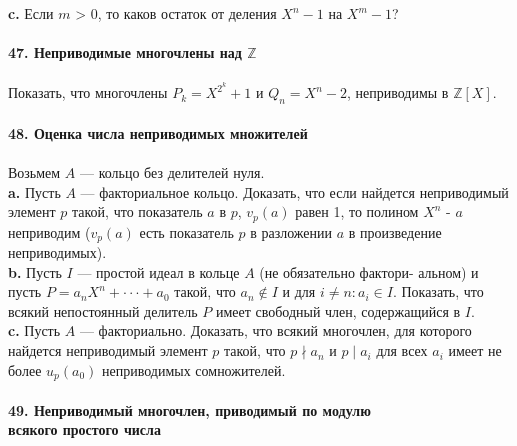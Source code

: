 \documentclass{mai_book}
\begin{document}
\noindent\hspace*{10pt}\textbf{c.} Если $m$ > 0, то каков остаток от деления $X^n  - 1$ на $X^m -1$?
\\
\\
\noindent\textbf{47. Неприводимые многочлены над $\mathbb{Z}$}\\\\
\hspace*{10pt} Показать, что многочлены $P_k=X^{2^{k}}+1$ и $Q_n=X^n-2$, неприводимы\linebreak
в $\mathbb{Z}[X]$.
\\
\\
\noindent\textbf{48. Оценка числа неприводимых множителей}\\\\
\hspace*{10pt} Возьмем $A$ — кольцо без делителей нуля.\\
\hspace*{10pt}\textbf{a.} Пусть $A$ — факториальное кольцо. Доказать, что если найдется\linebreak
неприводимый элемент $p$ такой, что показатель $a$ в $p$, $v_p(a)$ равен 1, то\linebreak
полином $X^n$ - $a$ неприводим ($v_p(a)$ есть показатель $p$ в разложении $a$ в\linebreak
произведение неприводимых).\\
\hspace*{10pt}\textbf{b.} Пусть $I$ — простой идеал в кольце $A$ (не обязательно фактори-\linebreak
альном) и пусть $P=a_nX^n+\cdot\cdot\cdot+a_0$ такой, что $a_n\notin I$ и для $i\neq n:a_i\in I$.\linebreak
Показать, что всякий непостоянный делитель $P$ имеет свободный член,\linebreak
содержащийся в $I$.\\
\hspace*{10pt}\textbf{c.} Пусть $A$ — факториально. Доказать, что всякий многочлен, для\linebreak
которого найдется неприводимый элемент $p$ такой, что $p\nmid a_n$ и $p\;|\;a_i$\linebreak
для всех $a_i$ имеет не более $u_p(a_0)$ неприводимых сомножителей.
\\
\\
\noindent\textbf{49. Неприводимый многочлен, приводимый по модулю\\
всякого простого числа}\\\\
\end{document}

